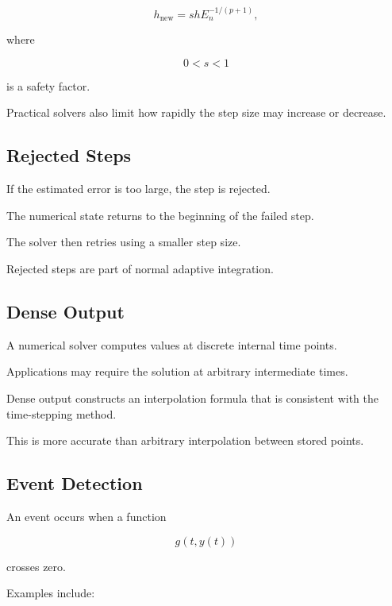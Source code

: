 \[
\boxed{
h_{\mathrm{new}}
=
s
h
E_n^{-1/(p+1)},
}
\]

where

\[
0<s<1
\]

is a safety factor.

Practical solvers also limit how rapidly the step size may increase or
decrease.

\subsection{Rejected Steps}
\label{subsec:ode-rejected-steps}

If the estimated error is too large, the step is rejected.

The numerical state returns to the beginning of the failed step.

The solver then retries using a smaller step size.

Rejected steps are part of normal adaptive integration.

\subsection{Dense Output}
\label{subsec:ode-dense-output}

A numerical solver computes values at discrete internal time points.

Applications may require the solution at arbitrary intermediate times.

Dense output constructs an interpolation formula that is consistent with
the time-stepping method.

This is more accurate than arbitrary interpolation between stored points.

\subsection{Event Detection}
\label{subsec:ode-event-detection}

An event occurs when a function

\[
\boxed{
g(t,y(t))
}
\]

crosses zero.

Examples include:

